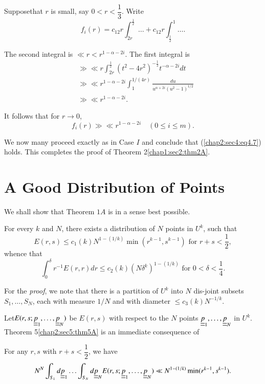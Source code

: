 Suppose\pageoriginale that $r$ is small, say $0 < r < \dfrac{1}{3}$. Write
\begin{equation*}
f_{i} (r) = c_{12} r \int_{2r}^{\frac{1}{2}} \ldots + c_{12} r \int_{\frac{1}{2}}^{1} \ldots .
\end{equation*}

The second integral is $\ll r < r^{1-\alpha-2i}$. The first integral is
\begin{align*}
& \gg \ll r \int_{2r}^{\frac{1}{2}} (t^{2} - 4r^{2})^{-\frac{1}{2}} t^{-\alpha-2i} dt\\
& \gg \ll r^{1-\alpha-2i} \int_{1}^{1/(4r)} \frac{du}{u^{\alpha + 2i} (u^{2} - 1)^{1/2}}\\
& \gg \ll r^{1-\alpha-2i}.
\end{align*}

It follows that for $r \to 0$,
$$
f_{i} (r) \gg \ll r^{1-\alpha-2i} \quad(0 \leq i \leq m).
$$

We now many proceed exactly as in Case $I$ and conclude that (\ref{chap2:sec4:eq4.7}) holds. This completes the proof of Theorem 2\ref{chap1:sec2:thm2A}.

\section{A Good Distribution of Points}\label{chap2:sec5} 

We shall show that Theorem $1A$ is in a sense best possible.

\begin{theorem}[ (K. B. Stolarsky, {[28\ref{k28:e28a}]})] \label{chap2:sec5:thm5A}
For every $k$ and $N$, there exists a distribution of $N$ points in $U^{k}$, such that
$$
E(r, s) \leq c_{1} (k) N^{1-(1/k)} \min (r^{k-1}, s^{k-1}) \text{ for } r+s < \dfrac{1}{2},
$$
whence that
$$
\int_{0}^{\delta} r^{-1} E(r, r) dr \leq c_{2} (k) (N \delta^{k})^{1-(1/k)} \text{ for } 0 < \delta < \frac{1}{4}.
$$
\end{theorem}

For the {\em proof}, we note that there is a partition of $U^{k}$ into $N$ dis-joint subsets $S_{1}, \ldots, S_{N}$, each with measure $1/N$ and with diameter $\leq c_{3} (k) N^{-1/k}$.

Let\pageoriginale $E(r, s ; \underline{\underline{p}}_{1}, \ldots,  \underline{\underline{p}}_{N})$ be $E(r, s)$ with respect to the $N$ points \break $\underline{\underline{p}}_{1}, \ldots,  \underline{\underline{p}}_{N}$ in $U^{k}$. Theorem 5\ref{chap2:sec5:thm5A} is an immediate consequence of 
\begin{lemma}\label{chap2:sec5:thm5B}
  For any $r, s$ with $r+s < \dfrac{1}{2}$, we have
  $$
  N^{N} \int_{S_{1}} d \underline{\underline{p}}_{1} \ldots \int_{S_{N}} d \underline{\underline{p}}_{N} E(r, s ;  \underline{\underline{p}}_{1}, \ldots,  \underline{\underline{p}}_{N}) \ll N^{1-(1/k)} \min (r^{k-1}, s^{k-1}).
  $$
\end{lemma}

